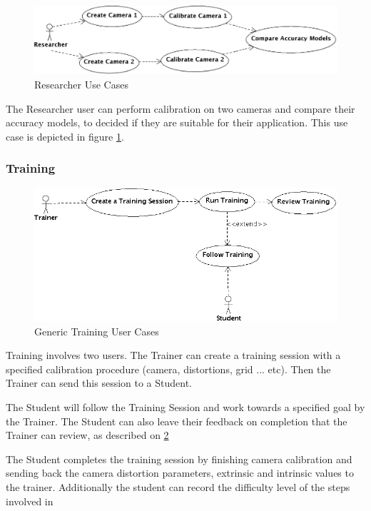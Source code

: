 \documentclass[11pt]{report}
\begin{document}
    \begin{figure}[htp]
    \centering
    \includegraphics[scale=0.15]{images/CompareCameras.png}
    \caption{Researcher Use Cases}
    \label{fig:ucc}
    \end{figure}

    The Researcher user can perform calibration on two cameras and compare their accuracy models, to decided if they are suitable for their application. This use case is depicted in figure \ref{fig:ucc}.

\subsubsection{Training}

    \begin{figure}[htp]
    \centering
    \includegraphics[scale=0.15]{images/Training.png}
    \caption{Generic Training User Cases}
    \label{fig:uco}
    \end{figure}

    Training involves two users. The Trainer can create a training session with a specified calibration procedure (camera, distortions, grid ... etc). Then the Trainer can send this session to a Student. 

    The Student will follow the Training Session and work towards a specified goal by the Trainer. The Student can also leave their feedback on completion that the Trainer can review, as described on \ref{fig:uco}

    The Student completes the training session by finishing camera calibration and sending back the camera distortion parameters, extrinsic and intrinsic values to the trainer. Additionally the student can record the difficulty level of the steps involved in 
\end{document}
